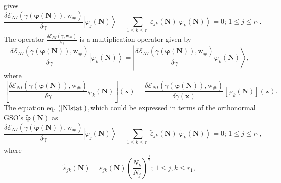\documentclass[aps,preprint]{revtex4}%
\begin{document}
gives%
\begin{equation}
\frac{\delta\mathcal{E}_{NI}\left(  \gamma\left(  \mathbf{\varphi}\left(
\mathbf{N}\right)  \right)  \mathbf{,}\mathrm{w}_{\#}\right)  }{\delta\gamma
}\left\vert \varphi_{j}\left(  \mathbf{N}\right)  \right\rangle -\sum_{1\leq
k\leq r_{1}}\varepsilon_{jk}\left(  \mathbf{N}\right)  \left\vert \varphi
_{k}\left(  \mathbf{N}\right)  \right\rangle =0;\,1\leq j\leq r_{1}.
\label{NIstat}%
\end{equation}
The operator $\frac{\delta\mathcal{E}_{NI}\left(  \gamma\mathbf{,}%
\mathrm{w}_{\#}\right)  }{\delta\gamma}$ is a multiplication operator given
by
\begin{equation}
\frac{\delta\mathcal{E}_{NI}\left(  \gamma\left(  \mathbf{\varphi}\left(
\mathbf{N}\right)  \right)  \mathbf{,}\mathrm{w}_{\#}\right)  }{\delta\gamma
}\left\vert \varphi_{k}\left(  \mathbf{N}\right)  \right\rangle =\left\vert
\frac{\delta\mathcal{E}_{NI}\left(  \gamma\left(  \mathbf{\varphi}\left(
\mathbf{N}\right)  \right)  \mathbf{,}\mathrm{w}_{\#}\right)  }{\delta\gamma
}\varphi_{k}\left(  \mathbf{N}\right)  \right\rangle ,
\end{equation}
where
\begin{equation}
\left[  \frac{\delta\mathcal{E}_{NI}\left(  \gamma\left(  \mathbf{\varphi
}\left(  \mathbf{N}\right)  \right)  \mathbf{,}\mathrm{w}_{\#}\right)
}{\delta\gamma}\varphi_{k}\left(  \mathbf{N}\right)  \right]  \left(
\mathbf{x}\right)  =\frac{\delta\mathcal{E}_{NI}\left(  \gamma\left(
\mathbf{\varphi}\left(  \mathbf{N}\right)  \right)  \mathbf{,}\mathrm{w}%
_{\#}\right)  }{\delta\gamma\left(  \mathbf{x}\right)  }\left[  \varphi
_{k}\left(  \mathbf{N}\right)  \right]  \left(  \mathbf{x}\right)  .
\end{equation}
The equation eq. $\left(  \ref{NIstat}\right)  ,$which could be expressed in
terms of the orthonormal GSO's $\mathbf{\tilde{\varphi}}\left(  \mathbf{N}%
\right)  $ as
\begin{equation}
\frac{\delta\mathcal{E}_{NI}\left(  \gamma\left(  \mathbf{\tilde{\varphi}%
}\left(  \mathbf{N}\right)  \right)  \mathbf{,}\mathrm{w}_{\#}\right)
}{\delta\gamma}\left\vert \tilde{\varphi}_{j}\left(  \mathbf{N}\right)
\right\rangle -\sum_{1\leq k\leq r_{1}}\tilde{\varepsilon}_{jk}\left(
\mathbf{N}\right)  \left\vert \tilde{\varphi}_{k}\left(  \mathbf{N}\right)
\right\rangle =0;\,1\leq j\leq r_{1},
\end{equation}
where
\begin{equation}
\tilde{\varepsilon}_{jk}\left(  \mathbf{N}\right)  =\varepsilon_{jk}\left(
\mathbf{N}\right)  \left(  \frac{N_{k}}{N_{j}}\right)  ^{\frac{1}{2}};\,1\leq
j,k\leq r_{1},
\end{equation}
\end{document}
